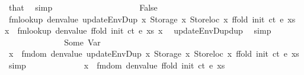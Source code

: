 \begin{isabellebody}
\ that\ \isamarkupfalse%
\ simp\isanewline
\ \ \ \ \ \ \ \ \isamarkupfalse%
\isanewline
\ \ \ \ \ \ \ \ \ \ \isamarkupfalse%
\ False\isanewline
\ \ \ \ \ \ \ \ \ \ \isamarkupfalse%
\ \isamarkupfalse%
\ {\isachardoublequoteopen}fmlookup\ {\isacharparenleft}{\kern0pt}denvalue\ {\isacharparenleft}{\kern0pt}updateEnvDup\ x\ {\isacharparenleft}{\kern0pt}Storage\ x{}{\isacharparenright}{\kern0pt}\ {\isacharparenleft}{\kern0pt}Storeloc\ x{\isacharparenright}{\kern0pt}\ {\isacharparenleft}{\kern0pt}ffold\ {\isacharparenleft}{\kern0pt}init\ ct{\isacharparenright}{\kern0pt}\ e\ xs{\isacharparenright}{\kern0pt}{\isacharparenright}{\kern0pt}{\isacharparenright}{\kern0pt}\ x{\isacharprime}{\kern0pt}\ {\isacharequal}{\kern0pt}\ fmlookup\ {\isacharparenleft}{\kern0pt}denvalue\ {\isacharparenleft}{\kern0pt}ffold\ {\isacharparenleft}{\kern0pt}init\ ct{\isacharparenright}{\kern0pt}\ e\ xs{\isacharparenright}{\kern0pt}{\isacharparenright}{\kern0pt}\ x{\isacharprime}{\kern0pt}{\isachardoublequoteclose}\ \isamarkupfalse%
\ updateEnvDup{\isacharunderscore}{\kern0pt}dup\ \isamarkupfalse%
\ simp\isanewline
\ \ \ \ \ \ \ \ \ \ \isamarkupfalse%
\ \isamarkupfalse%
\ {\isacharasterisk}{\kern0pt}{\isacharasterisk}{\kern0pt}\ Some\ Var\ \isamarkupfalse%
\ {\isacharasterisk}{\kern0pt}{\isacharasterisk}{\kern0pt}{\isacharasterisk}{\kern0pt}{\isacharcolon}{\kern0pt}{\isachardoublequoteopen}x{\isacharprime}{\kern0pt}\ {\isacharbar}{\kern0pt}{\isasymin}{\isacharbar}{\kern0pt}\ fmdom\ {\isacharparenleft}{\kern0pt}denvalue\ {\isacharparenleft}{\kern0pt}updateEnvDup\ x\ {\isacharparenleft}{\kern0pt}Storage\ x{}{\isacharparenright}{\kern0pt}\ {\isacharparenleft}{\kern0pt}Storeloc\ x{\isacharparenright}{\kern0pt}\ {\isacharparenleft}{\kern0pt}ffold\ {\isacharparenleft}{\kern0pt}init\ ct{\isacharparenright}{\kern0pt}\ e\ xs{\isacharparenright}{\kern0pt}{\isacharparenright}{\kern0pt}{\isacharparenright}{\kern0pt}{\isachardoublequoteclose}\ \isamarkupfalse%
\ simp\isanewline
\ \ \ \ \ \ \ \ \ \ \isamarkupfalse%
\ \isamarkupfalse%
\ {\isachardoublequoteopen}x{\isacharprime}{\kern0pt}\ {\isacharbar}{\kern0pt}{\isasymin}{\isacharbar}{\kern0pt}\ fmdom\ {\isacharparenleft}{\kern0pt}denvalue\ {\isacharparenleft}{\kern0pt}ffold\ {\isacharparenleft}{\kern0pt}init\ ct{\isacharparenright}{\kern0pt}\ e\ xs{\isacharparenright}{\kern0pt}{\isacharparenright}{\kern0pt}{\isachardoublequoteclose}\ \isamarkupfalse%

\end{isabellebody}
